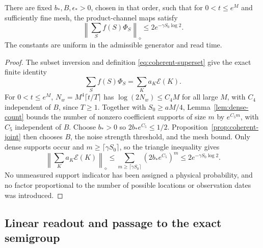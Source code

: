 \begin{proposition}
\label{prop:general-sum}
There are fixed \(b_*,B,\epsilon_*>0\), chosen in that order,
such that for \(0<t\le e^M\) and sufficiently fine mesh,
the product-channel maps satisfy
\begin{equation}\label{eq:general-bad-map}
 \left\|\sum_S f(S)\Phi_S\right\|_\diamond
 \le 2e^{-\gamma S_0\log2}.
\end{equation}
The constants are uniform in the admissible generator and read time.
\end{proposition}
\begin{proof}
The subset inversion and definition \eqref{eq:coherent-superset}
give the exact finite identity
\[
 \sum_S f(S)\Phi_S=\sum_K a_K\mathcal E(K).
\]
For \(0<t\le e^M\),
\(N_w=M^4\lceil t/T\rceil\) has
\(\log(2N_w)\le C_4M\) for all large \(M\), with \(C_4\)
independent of \(B\), since \(T\ge1\).
Together with \(S_0\ge aM/4\),
Lemma~\ref{lem:dense-count} bounds the number of nonzero
coefficient supports of size \(m\) by \(e^{C_5m}\), with
\(C_5\) independent of \(B\).
Choose \(b_*>0\) so \(2b_*e^{C_5}\le1/2\).
Proposition~\ref{prop:coherent-joint} then chooses \(B\),
the noise strength threshold, and the mesh bound.
Only dense supports occur and \(m\ge\lceil\gamma S_0\rceil\),
so the triangle inequality gives
\[
 \left\|\sum_K a_K\mathcal E(K)\right\|_\diamond
 \le\sum_{m\ge\lceil\gamma S_0\rceil}
                    (2b_*e^{C_5})^m
 \le2e^{-\gamma S_0\log2}.
\]
No unmeasured support indicator has been assigned a physical
probability, and no factor proportional to the number of
possible locations or observation dates was introduced.
\end{proof}

\subsection{Linear readout and passage to the exact semigroup}

